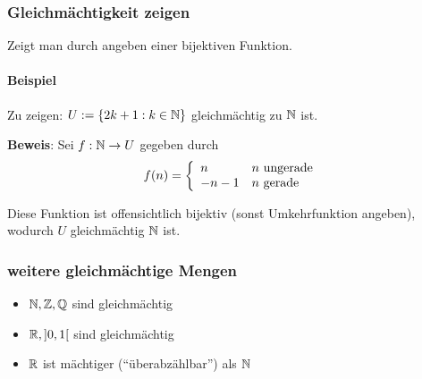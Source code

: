 \begin{multicols}{2}
\subsubsection{Gleichmächtigkeit zeigen}
Zeigt man durch angeben einer bijektiven Funktion.

\paragraph{Beispiel}
Zu zeigen: $U := \{ 2k + 1: k \in \mathbb{N} \}$ gleichmächtig zu $\mathbb{N}$ ist.

\textbf{Beweis}: Sei $f: \mathbb{N} \rightarrow U$ gegeben durch
\begin{equation*}
f(n) = \left\{
	\begin{array}{l l}
		n & n \text{ ungerade}\\
		-n - 1 & n \text{ gerade}
	\end{array}
\right.
\end{equation*}

Diese Funktion ist offensichtlich bijektiv (sonst Umkehrfunktion angeben), wodurch $U$ gleichmächtig $\mathbb{N}$ ist.

\subsubsection{weitere gleichmächtige Mengen}
\begin{itemize}
	\item $\mathbb{N}, \mathbb{Z}, \mathbb{Q}$ sind gleichmächtig
	\item $\mathbb{R}, ]0,1[$ sind gleichmächtig
	\item $\mathbb{R}$ ist mächtiger (``überabzählbar'') als $\mathbb{N}$
\end{itemize}

\end{multicols}